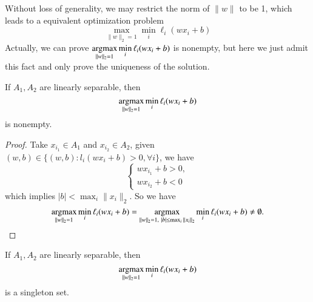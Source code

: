 Without loss of generality, we may restrict the norm of $\|w\|$ to be 1, which leads to a equivalent optimization problem
\begin{equation}
\max_{\|w\|_2 = 1} \min_{i} \ell_i(wx_i+b)
\end{equation}
Actually, {we can prove $\displaystyle \mathop{\rm argmax}_{\|w\|_2 = 1} \min_{i} \ell_i(wx_i+b)$ is nonempty, but here we just admit this fact and only prove the uniqueness of the solution.}

\begin{lemma}
	If $A_1,A_2$ are linearly separable, then
	\begin{equation}\label{binarySVM}
	\mathop{\rm argmax}_{\|w\|_2 = 1} \min_{i} \ell_i(wx_i+b)
	\end{equation}
	is nonempty.
\end{lemma}

\begin{proof}
	Take $x_{i_1} \in A_1$ and  $x_{i_2} \in A_2$,  given $(w,b)\in \{(w,b): l_i(wx_i +b)>0, \forall i\}$, we have
	\begin{equation}
		\begin{cases}
		wx_{i_1} + b > 0,\\
		wx_{i_2} + b < 0
		\end{cases}
	\end{equation}
	which implies $|b| < \max_{i} \|x_i\|_2$. So we have
	\begin{equation}
		\mathop{\rm argmax}_{\|w\|_2 = 1} \min_{i} \ell_i(wx_i+b) = \mathop{\rm argmax}_{\|w\|_2 = 1, ~|b|\leq \max_{i} \|x_i\|_2} \min_{i} \ell_i(wx_i+b) \neq \emptyset.
	\end{equation}
\end{proof}

\begin{lemma}
	If $A_1,A_2$ are linearly separable, then
	\begin{equation}
		\mathop{\rm argmax}_{\|w\|_2 = 1} \min_{i} \ell_i(wx_i+b)
	\end{equation}
	 is a singleton set.
\end{lemma}

